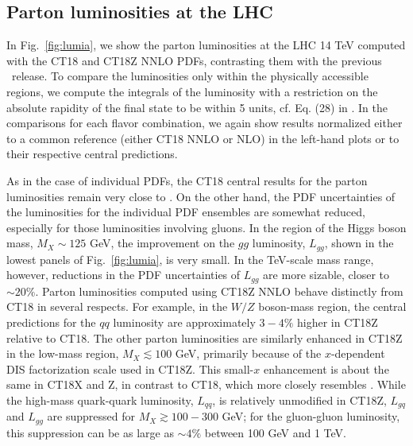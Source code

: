 \subsection{Parton luminosities at the LHC
\label{sec:PDFLuminosities}
}

In Fig.~\ref{fig:lumia}, we show the parton luminosities
at the
LHC 14 TeV computed with the CT18 and CT18Z NNLO PDFs, contrasting them with
the previous \CTHERAII~release. To compare the luminosities only within the physically accessible regions, we compute the integrals of the luminosity with a restriction on the absolute rapidity of the final state to be
within 5 units, cf. Eq. (28) in \cite{Hou:2016sho}. In the comparisons for each
flavor combination, we again show results normalized either to a common reference 
(either CT18 NNLO or NLO) in the left-hand plots or to their respective central
predictions.

As in the case of individual PDFs, the CT18 central results for the parton
luminosities remain very close to \CTHERAII. On the other hand, the
PDF uncertainties of the luminosities for the individual PDF ensembles
are somewhat reduced, especially for those 
luminosities involving gluons. In the region of the Higgs 
boson mass, $M_X\! \sim\! 125$ GeV, the improvement on the $gg$ luminosity, $L_\mathit{gg}$, shown in the lowest panels of Fig.~\ref{fig:lumia}, is very small.
In the TeV-scale mass range, however, reductions in the PDF uncertainties of $L_\mathit{gg}$ are more sizable, closer to $\sim\!20\%$.
Parton luminosities computed using CT18Z NNLO behave distinctly from CT18 in several respects. For example, in the
$W/Z$ boson-mass region, the central predictions for the $qq$ luminosity are approximately $3\!-\!4\%$
higher in CT18Z relative to CT18. The other parton luminosities are similarly enhanced in CT18Z
in the low-mass region, $M_X\! \lesssim\! 100$ GeV, primarily because of the $x$-dependent DIS factorization scale used in CT18Z. This small-$x$ enhancement is about the same in CT18X and Z, in contrast to CT18, which more closely resembles \CTHERAII.
While the high-mass quark-quark luminosity, $L_{qq}$, is relatively unmodified in CT18Z, 
$L_{gq}$ and $L_{gg}$ are suppressed for $M_X\! \gtrsim\! 100\!-\!300$ GeV; for the
gluon-gluon luminosity, this suppression can be as large as $\sim\!4\%$
between 100 GeV and 1 TeV. 

